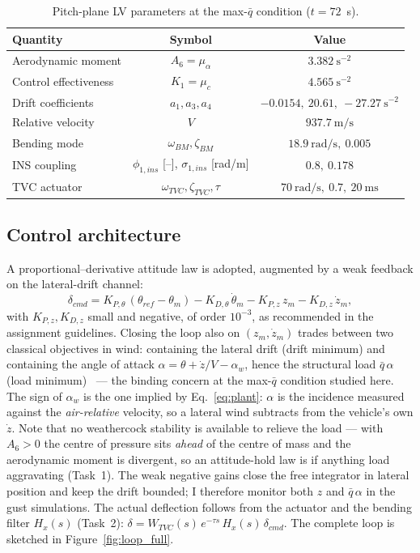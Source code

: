 \documentclass[../main.tex]{subfiles}
\begin{document}
\begin{table}[H]
\centering
\caption{Pitch-plane LV parameters at the max-$\bar q$ condition ($t=72$~s).}
\label{tab:params}
\begin{tabular}{lcc}
\toprule
Quantity & Symbol & Value \\
\midrule
Aerodynamic moment   & $A_6=\mu_\alpha$ & $3.382~\text{s}^{-2}$ \\
Control effectiveness & $K_1=\mu_c$     & $4.565~\text{s}^{-2}$ \\
Drift coefficients    & $a_1,a_3,a_4$   & $-0.0154,\ 20.61,\ -27.27~\text{s}^{-2}$ \\
Relative velocity      & $V$            & $937.7~\text{m/s}$ \\
Bending mode           & $\omega_{BM},\zeta_{BM}$ & $18.9~\text{rad/s},\ 0.005$ \\
INS coupling           & $\phi_{1,ins}$ [--], $\sigma_{1,ins}$ [rad/m] & $0.8,\ 0.178$ \\
TVC actuator           & $\omega_{TVC},\zeta_{TVC},\tau$ & $70~\text{rad/s},\ 0.7,\ 20~\text{ms}$ \\
\bottomrule
\end{tabular}
\end{table}

\subsection{Control architecture}

A proportional--derivative attitude law is adopted, augmented by a weak feedback
on the lateral-drift channel:
\begin{equation}
\delta_{cmd} =
K_{P,\theta}\,(\theta_{ref}-\theta_m) - K_{D,\theta}\,\dot\theta_m
- K_{P,z}\,z_m - K_{D,z}\,\dot z_m ,
\label{eq:control}
\end{equation}
with $K_{P,z},K_{D,z}$ small and negative, of order $10^{-3}$, as recommended in
the assignment guidelines. Closing the loop also on $(z_m,\dot z_m)$ trades
between two classical objectives in wind: containing the lateral
drift (drift minimum) and containing the angle of attack
$\alpha = \theta + \dot z/V - \alpha_w$, hence the structural load
$\bar q\,\alpha$ (load minimum)~\cite[Lecture~17]{dclvnotes} --- the binding concern at the
max-$\bar q$ condition studied here. The sign of $\alpha_w$ is the one implied by
Eq.~\eqref{eq:plant}: $\alpha$ is the incidence measured against the
\emph{air-relative} velocity, so a lateral wind subtracts from the vehicle's own
$\dot z$. Note that no weathercock stability is available to relieve the load ---
with $A_6 > 0$ the centre of pressure sits \emph{ahead} of the centre of mass and
the aerodynamic moment is divergent, so an attitude-hold law is if anything load
aggravating (Task~1). The weak negative gains close the free integrator in
lateral position and keep the drift bounded; I therefore monitor both $z$ and
$\bar q\,\alpha$ in the gust simulations. The actual deflection follows from the actuator and
the bending filter $H_x(s)$ (Task~2): $\delta = W_{TVC}(s)\,e^{-\tau s}\,H_x(s)\,\delta_{cmd}$.
The complete loop is sketched in Figure~\ref{fig:loop_full}.
\end{document}
